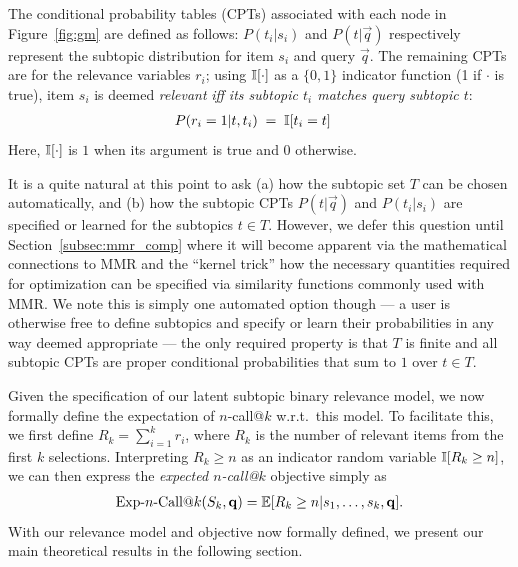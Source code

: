 The conditional probability tables (CPTs) associated with each node in
Figure~\ref{fig:gm} are defined as follows: $P(t_i|s_i)$ and
$P(t|\vec{q})$ respectively represent the subtopic distribution for
item $s_i$ and query $\vec{q}$.
The remaining CPTs are for
the relevance variables $r_i$; using $\mathbb{I}[\cdot]$ as a $\{0,1\}$
indicator function (1 if $\cdot$ is true), item $s_i$ is deemed
\emph{relevant} \emph{iff} \emph{its subtopic $t_i$ matches query
  subtopic $t$}:
\begin{align*}
P(r_{i}=1|t, t_{i}) & \; = \; \mathbb{I}[t_{i} = t]
\end{align*}
Here, $\mathbb{I}[\cdot]$ is $1$ when its argument is true and $0$ otherwise.

It is a quite natural at this point to ask (a) how the subtopic set
$T$ can be chosen automatically, and (b) how the subtopic CPTs
$P(t|\vec{q})$ and $P(t_i|s_i)$ are specified or learned for the
subtopics $t \in T$.  However, we defer this question until
Section~\ref{subsec:mmr_comp} where it will become apparent via the
mathematical connections to MMR and the ``kernel trick'' how the
necessary quantities required for optimization can be specified via
similarity functions commonly used with MMR.  We note this
is simply one automated option though --- a user is otherwise free to define subtopics
and specify or learn their probabilities in any way deemed appropriate --- the
only required property is that $T$ is finite and all subtopic CPTs are proper conditional
probabilities that sum to $1$ over $t \in T$.


Given the specification of our latent subtopic binary relevance model,
we now formally define the expectation of $n$-call@$k$ w.r.t.\ this
model.  To facilitate this, we first define $R_k = \sum_{i=1}^k r_i$,
where $R_k$ is the number of relevant items from the first $k$
selections.  Interpreting $R_k \geq n$ as an indicator random variable
$\mathbb{I}[R_k \geq n]$, we can then express the \emph{expected $n$-call@$k$}
objective simply as
\begin{align}
\label{eq:setRelevance}
  \ExpNCall{n}(S_k,\vec{q})
  = \mathbb{E}[R_k\geq n|s_1,\dots,s_k,\vec{q}] .  
\end{align}
With our relevance model and objective now formally defined, 
we present our main theoretical results in the following section.
